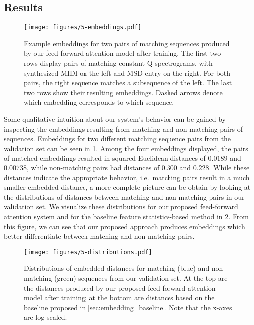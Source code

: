 \subsection{Results}

\begin{figure}
  \texttt{[image: figures/5-embeddings.pdf]}
  \caption[Example embeddings for two pairs of sequences]{Example embeddings for two pairs of matching sequences produced by our feed-forward attention model after training.
The first two rows display pairs of matching constant-Q spectrograms, with synthesized MIDI on the left and MSD entry on the right.
For both pairs, the right sequence matches a subsequence of the left.
The last two rows show their resulting embeddings.
Dashed arrows denote which embedding corresponds to which sequence.}
  \label{fig:embeddings}
\end{figure}

Some qualitative intuition about our system's behavior can be gained by inspecting the embeddings resulting from matching and non-matching pairs of sequences.
Embeddings for two different matching sequence pairs from the validation set can be seen in \cref{fig:embeddings}.
Among the four embeddings displayed, the pairs of matched embeddings resulted in squared Euclidean distances of $0.0189$ and $0.00738$, while non-matching pairs had distances of $0.300$ and $0.228$.
While these distances indicate the appropriate behavior, i.e.\ matching pairs result in a much smaller embedded distance, a more complete picture can be obtain by looking at the distributions of distances between matching and non-matching pairs in our validation set.
We visualize these distributions for our proposed feed-forward attention system and for the baseline feature statistics-based method in \cref{fig:embedding_distributions}.
From this figure, we can see that our proposed approach produces embeddings which better differentiate between matching and non-matching pairs.

\begin{figure}
  \texttt{[image: figures/5-distributions.pdf]}
  \caption[Distributions of matching and non-matching distances]{Distributions of embedded distances for matching (blue) and non-matching (green) sequences from our validation set.
At the top are the distances produced by our proposed feed-forward attention model after training; at the bottom are distances based on the baseline proposed in \cref{sec:embedding_baseline}.
Note that the x-axes are log-scaled.}
  \label{fig:embedding_distributions}
\end{figure}

